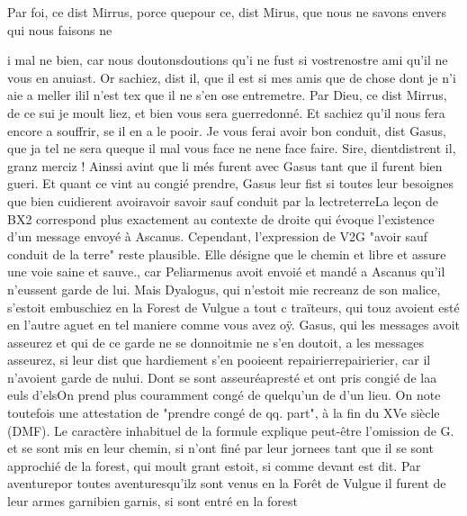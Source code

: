 \documentclass{article}
\begin{document}
\begin{pages}
                     Par foi, 
                           ce dist Mirrus, porce quepour ce, dist Mirus, que nous ne savons envers qui nous faisons 
                     ne
                  
                     
                     i mal ne bien, car 
                     nous doutonsdoutions qu’i ne fust si 
                     vostrenostre ami qu’il ne vous en anuiast.
               Or sachiez, dist il, que il est si mes amis que de
                  chose dont je n’i aie a meller 
                     ilil n'est tex que il ne s’en ose entremetre.
               Par Dieu, 
                     ce dist Mirrus, de ce sui je moult liez, 
                     et bien vous sera guerredonné. Et sachiez qu’il nous fera encore a souffrir, se il en a le pooir.
               Je vous ferai avoir bon conduit, dist Gasus, que ja tel ne sera 
                     queque il mal vous face 
                     ne nene face faire.
               Sire, 
                     dientdistrent il, granz merciz ! \pend
            \pstart Ainssi avint que li més furent avec Gasus tant que il furent bien gueri. Et quant ce vint au congié prendre, Gasus leur fist si
               toutes leur besoignes que bien cuidierent 
                  avoiravoir savoir sauf conduit par la 
                  lectreterreLa leçon de BX2 correspond plus exactement au
                  contexte de droite qui évoque l'existence d'un message envoyé à Ascanus.
                  Cependant, l'expression de V2G "avoir sauf conduit de la terre" reste plausible.
                  Elle désigne que le chemin et libre et assure une voie saine et sauve., car
                  Peliarmenus avoit envoié 
                  et mandé a Ascanus qu’il n’eussent garde de lui.
               Mais Dyalogus, qui n’estoit mie recreanz de son
               malice, s’estoit embuschiez en la Forest de
                  Vulgue a tout c traïteurs, qui touz avoient esté en l’autre
               aguet en tel maniere comme vous avez oÿ. Gasus, qui 
                  les messages avoit asseurez et qui de ce garde ne se
                     donnoitmie ne s'en doutoit, a les messages asseurez, si leur dist que hardiement s’en pooieent 
                  repairierrepairierier, car il n’avoient garde de nului. Dont 
                  se sont 
                        asseuréapresté et ont pris congié 
                  de laa euls
                  d'elsOn prend plus couramment congé de quelqu'un de d'un
                  lieu. On note toutefois une attestation de "prendre congé de qq. part", à la fin
                  du XVe siècle (DMF). Le caractère inhabituel de la formule explique peut-être
                  l'omission de G. et se sont mis en leur chemin, si n’ont finé par leur
               jornees 
                  tant que il 
                        se sont approchié de la
                     forest, qui moult grant estoit, si comme devant est
                        dit. 
                        Par aventurepor toutes aventuresqu'ilz sont venus en la Forêt de Vulgue il furent de leur armes 
                  garnibien garnis, 
                  si sont entré en la
                        forest
                     

\end{pages}
\end{document}
